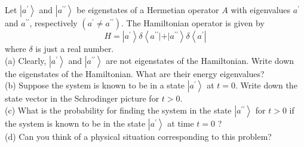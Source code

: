 
\begin{problem}
	Let $\left|a^{\prime}\right\rangle$ and $\left|a^{\prime \prime}\right\rangle$ be eigenstates of a Hermetian operator $A$ with eigenvalues $a^{\prime}$ and $a^{\prime \prime}$, respectively $\left(a^{\prime} \neq a^{\prime \prime}\right)$. The Hamiltonian operator is given by
\[
H=\left|a^{\prime}\right\rangle \delta\left\langle a^{\prime \prime}|+| a^{\prime \prime}\right\rangle \delta\left\langle a^{\prime}\right|
\]
where $\delta$ is just a real number.\\
(a) Clearly, $\left|a^{\prime}\right\rangle$ and $\left|a^{\prime \prime}\right\rangle$ are not eigenstates of the Hamiltonian. Write down the eigenstates of the Hamiltonian. What are their energy eigenvalues?\\
(b) Suppose the system is known to be in a state $\left|a^{\prime}\right\rangle$ at $t=0$. Write down the state vector in the Schrodinger picture for $t>0$.\\
(c) What is the probability for finding the system in the state $\left|a^{\prime \prime}\right\rangle$ for $t>0$ if the system is known to be in the state $\left|a^{\prime}\right\rangle$ at time $t=0$ ?\\
(d) Can you think of a physical situation corresponding to this problem?
\end{problem}
